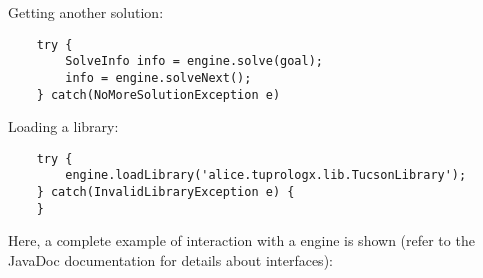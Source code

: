 \noindent Getting another solution:

{\tt\scriptsize{\begin{verbatim}
    try {
        SolveInfo info = engine.solve(goal);
        info = engine.solveNext();
    } catch(NoMoreSolutionException e)
\end{verbatim} }}

\noindent Loading a library:

{\tt\scriptsize{\begin{verbatim}
    try {
        engine.loadLibrary('alice.tuprologx.lib.TucsonLibrary');
    } catch(InvalidLibraryException e) {
    }
\end{verbatim} }}

\noindent Here, a complete example of interaction with a
\tuprolog{} engine is shown (refer to the JavaDoc documentation for
details about interfaces):

